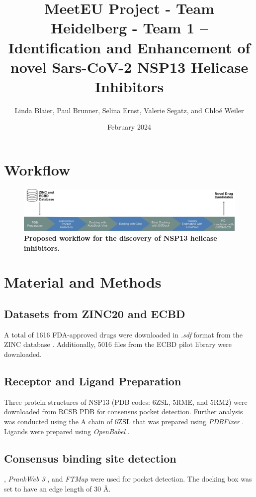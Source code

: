 \documentclass[11pt, letterpaper, titlepage]{article}
\title{MeetEU Project - Team Heidelberg - Team 1 -- \\ Identification and Enhancement of novel Sars-CoV-2 NSP13 Helicase Inhibitors}
\author{Linda Blaier, Paul Brunner, Selina Ernst, Valerie Segatz, and Chlo\'{e} Weiler}
\date{February 2024}
\begin{document}
\maketitle

\ihead{\headmark}
\cfoot{\pagemark}   %

\section{Workflow}

\begin{figure}[h]
  \centering
  \includegraphics[width=\textwidth]{Workflow_MeetEU.pdf}
  \caption*{\textbf{Proposed workflow for the discovery of NSP13 helicase inhibitors.} }
  \label{workflow}
\end{figure}

\setcounter{figure}{0}
\renewcommand{\thefigure}{\arabic{figure}}


\section{Material and Methods}
\subsection{Datasets from ZINC20 and ECBD}
A total of 1616 FDA-approved drugs were downloaded in \textit{.sdf} format from the ZINC database \cite{Irwin.2020}. Additionally, 5016 files from the ECBD pilot library were downloaded.

\subsection{Receptor and Ligand Preparation}
Three protein structures of NSP13 (PDB codes: 6ZSL, 5RME, and 5RM2) were downloaded from RCSB PDB for consensus pocket detection. Further analysis was conducted using the A chain of 6ZSL that was prepared using \textit{PDBFixer} \cite{Eastman_2017}. Ligands were prepared using \textit{OpenBabel} \cite{OpenBabel}.
\subsection{Consensus binding site detection}
 \cite{package_Fpocket}, \textit{PrankWeb 3} \cite{package_P2Rank,package_PrankWeb,package_PrankWeb3}, and \textit{FTMap} \cite{package_FTMAP} were used for pocket detection. The docking box was set to have an edge length of 30 \AA.
\end{document}
